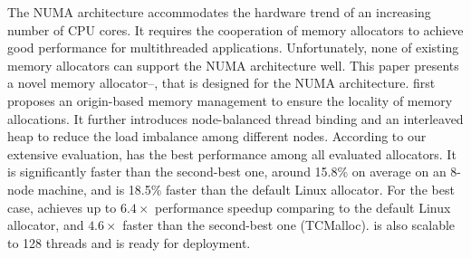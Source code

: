 The NUMA architecture accommodates the hardware trend of an increasing number of CPU cores. It requires the cooperation of memory allocators to achieve good performance for multithreaded applications. Unfortunately, none of existing memory allocators can support the NUMA architecture well.
This paper presents a novel memory allocator--\NM{}, that is designed for the NUMA architecture. \NM{} first proposes an origin-based memory management to ensure the locality of memory allocations. It further introduces node-balanced thread binding and an interleaved heap to reduce the load imbalance among different nodes. 
According to our extensive evaluation, \NM{} has the best performance among all evaluated allocators. It is significantly faster than the second-best one, around 15.8\% on average on an 8-node machine, and is 18.5\% faster than the default Linux allocator. For the best case, \NM{} achieves up to $6.4\times$ performance speedup comparing to the default Linux allocator, and $4.6\times$ faster than the second-best one (TCMalloc). \NM{} is also scalable to 128 threads and is ready for deployment.